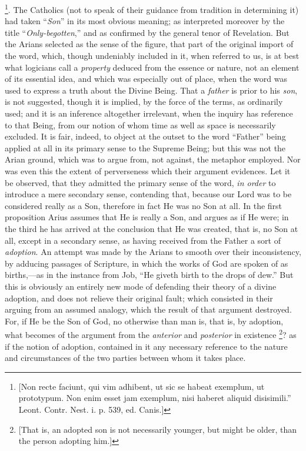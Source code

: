 \footnote{[Non recte faciunt, qui vim adhibent, ut sic
se habeat exemplum, ut prototypum. Non enim esset jam exemplum, nisi
haberet aliquid disisimili.'' Leont. Contr. Nest. i. p. 539, ed.
Canis.]}. The Catholics (not to
speak of their guidance from tradition in determining it) had taken
``\emph{Son}'' in its most obvious meaning; as interpreted
moreover by the title ``\emph{Only-begotten},'' and as
confirmed by the general tenor of Revelation. But the Arians selected
as the sense of the figure, that part of the original import of the
word, which, though undeniably included in it, when referred to us, is
at best what logicians call a \emph{property} deduced from the essence
or nature, not an element of its essential idea, and which was
especially out of place, when the word was used to express a truth
about the Divine Being. That a \emph{father} is prior to his \emph{son},
is not suggested, though it is implied, by the force of the terms, as
ordinarily used; and it is an inference altogether irrelevant, when
the inquiry has reference to that Being, from our notion of whom time
as well as space is necessarily excluded. It is fair, indeed, to
object at the outset to the word ``Father'' being applied at
all in its primary sense to the Supreme Being; but this was not the
Arian ground, which was to argue from, not against, the metaphor
employed. Nor was even this the extent of perverseness which their
argument evidences. Let it be observed, that they admitted the primary
sense of the word, \emph{in order} to introduce a mere secondary
sense, contending that, because our Lord was to be considered really
as a Son, therefore in fact He was no Son at all. In the first
proposition Arius assumes that He is really a Son, and argues as if He
were; in the third he has arrived at the conclusion that He was
created, that is, no Son at all, except in a secondary sense, as
having received from the Father a sort of \emph{adoption}. An attempt
was made by the Arians to smooth over their inconsistency, by adducing
passages of Scripture, in which the works of God are spoken of as
births,—as in the instance from Job, ``He giveth birth to the
drops of dew.'' But this is obviously an entirely new mode of
defending their theory of a divine adoption, and does not relieve
their original fault; which consisted in their arguing from an assumed
analogy, which the result of that argument destroyed. For, if He be
the Son of God, no otherwise than man is, that is, by adoption, what
becomes of the argument from the \emph{anterior} and \emph{posterior}
in existence \footnote{[That is, an adopted son is not necessarily
younger, but might be older, than the person adopting him.]}? as if the
notion of adoption, contained in it any necessary reference to the
nature and circumstances of the two parties between whom it takes
place.

